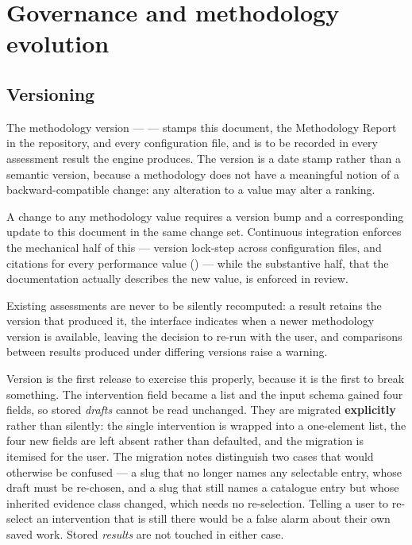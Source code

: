 \section{Governance and methodology evolution}
\label{sec:governance}

\subsection{Versioning}

The methodology version --- \methver{} --- stamps this document, the
Methodology Report in the repository, and every configuration file, and is to
be recorded in every assessment result the engine produces. The version is a
date stamp rather than a semantic version, because a methodology does not have
a meaningful notion of a backward-compatible change: any alteration to a value
may alter a ranking.

A change to any methodology value requires a version bump and a corresponding
update to this document in the same change set. Continuous integration enforces
the mechanical half of this --- version lock-step across configuration files,
and citations for every performance value () --- while
the substantive half, that the documentation actually describes the new value,
is enforced in review.

Existing assessments are never to be silently recomputed: a result retains the
version that produced it, the interface indicates when a newer methodology
version is available, leaving the decision to re-run with the user, and
comparisons between results produced under differing versions raise a warning.

Version \methver{} is the first release to exercise this properly, because it
is the first to break something. The intervention field became a list and the
input schema gained four fields, so stored \emph{drafts} cannot be read
unchanged. They are migrated \textbf{explicitly} rather than silently: the
single intervention is wrapped into a one-element list, the four new fields are
left absent rather than defaulted, and the migration is itemised for the user.
The migration notes distinguish two cases that would otherwise be confused ---
a slug that no longer names any selectable entry, whose draft must be
re-chosen, and a slug that still names a catalogue entry but whose inherited
evidence class changed, which needs no re-selection. Telling a user to
re-select an intervention that is still there would be a false alarm about
their own saved work. Stored \emph{results} are not touched in either case.

